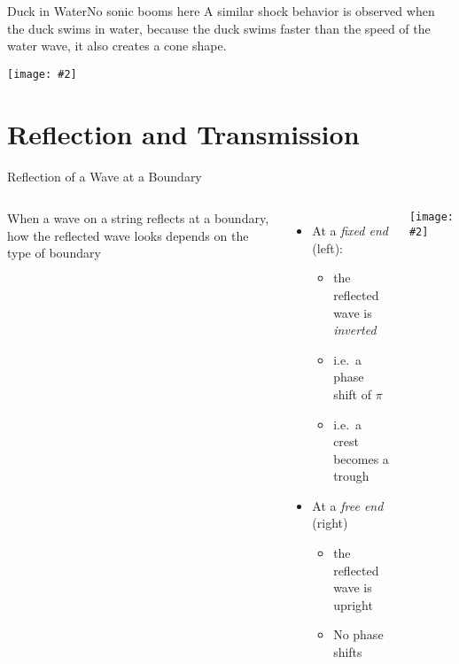 \documentclass[12pt,aspectratio=169]{beamer}
\newcommand{\pic}[2]{\texttt{[image: \#2]}}
\begin{document}
\begin{frame}{Duck in Water}{No sonic booms here}
  A similar shock behavior is observed when the duck swims in water, because
  the duck swims faster than the speed of the water wave, it also creates a
  cone shape.
  \begin{center}
    \pic{.5}{duck.jpg}
  \end{center}

\end{frame}



\section{Reflection and Transmission}

\begin{frame}{Reflection of a Wave at a Boundary}
  \begin{columns}
    When a wave on a string reflects at a boundary, how the reflected wave looks
    depends on the type of boundary
    \begin{itemize}
    \item At a \emph{fixed end} (left):
      \begin{itemize}
      \item the reflected wave is \emph{inverted}
      \item i.e.\ a phase shift of $\pi$
      \item i.e.\ a crest becomes a trough
      \end{itemize}
    \item At a \emph{free end} (right)
      \begin{itemize}
      \item the reflected wave is upright
      \item No phase shifts
      \end{itemize}
    \end{itemize}
    
    \pic{1}{22.png}
  \end{columns}
\end{frame}
\end{document}
